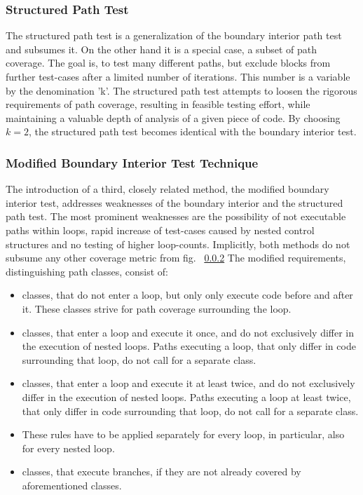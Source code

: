 		\subsubsection{Structured Path Test}
		The structured path test is a generalization of the boundary interior path test and subsumes it. On the other hand it is a special case, a subset of path coverage. The goal is, to test many different paths, but exclude blocks from further test-cases after a limited number of iterations. This number is a variable by the denomination 'k'. The structured path test attempts to loosen the rigorous requirements of path coverage, resulting in feasible testing effort, while maintaining a valuable depth of analysis of a given piece of code. By choosing $ k = 2 $, the structured path test becomes identical with the boundary interior test. \cite{Howden1978AnEO}
		\subsubsection{Modified Boundary Interior Test Technique}
		The introduction of a third, closely related method, the modified boundary interior test, addresses weaknesses of the boundary interior and the structured path test. The most prominent weaknesses are the possibility of not executable paths within loops, rapid increase of test-cases caused by nested control structures and no testing of higher loop-counts. Implicitly, both methods do not subsume any other coverage metric from fig. ~\ref{}
		The modified requirements, distinguishing path classes, consist of:
		\begin{itemize} \setlength\itemsep{1px}
		\item classes, that do not enter a loop, but only only execute code before and after it. These classes strive for path coverage surrounding the loop.
		\item classes, that enter a loop and execute it once, and do not exclusively differ in the execution of nested loops. Paths executing a loop, that only differ in code surrounding that loop, do not call for a separate class.
		\item classes, that enter a loop and execute it at least twice, and do not exclusively differ in the execution of nested loops. Paths executing a loop at least twice, that only differ in code surrounding that loop, do not call for a separate class.
		\item These rules have to be applied separately for every loop, in particular, also for every nested loop.
		\item classes, that execute branches, if they are not already covered by aforementioned classes.
		\end{itemize}
		
